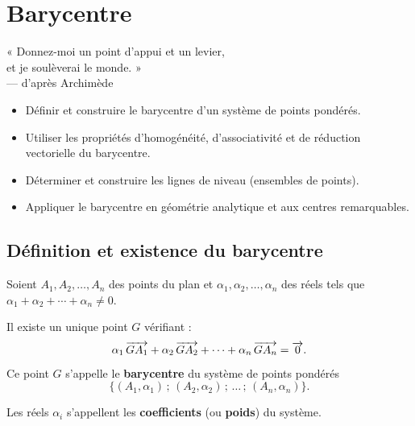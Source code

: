 \chapter{Barycentre}
\begin{citationchapitre}
	« Donnez-moi un point d'appui et un levier,\\
	et je soulèverai le monde. »\\[0.4em]
	— d'après Archimède
\end{citationchapitre}

\begin{objectifs}
	\begin{itemize}[label=\textbullet]
		\item Définir et construire le barycentre d'un système de points pondérés.
		\item Utiliser les propriétés d'homogénéité, d'associativité et de
		réduction vectorielle du barycentre.
		\item Déterminer et construire les lignes de niveau (ensembles de points).
		\item Appliquer le barycentre en géométrie analytique et aux centres
		remarquables.
	\end{itemize}
\end{objectifs}


\section{Définition et existence du barycentre}

\begin{definition}
	Soient $A_1, A_2, \ldots, A_n$ des points du plan et $\alpha_1, \alpha_2, \ldots, \alpha_n$
	des réels tels que $\alpha_1 + \alpha_2 + \cdots + \alpha_n \neq 0$.

	Il existe un unique point $G$ vérifiant :
	$$
	\alpha_1\,\overrightarrow{GA_1} + \alpha_2\,\overrightarrow{GA_2} + \cdots + \alpha_n\,\overrightarrow{GA_n} = \overrightarrow{0}.
	$$
	Ce point $G$ s'appelle le \textbf{barycentre} du système de points pondérés
	$$
	\{(A_1,\alpha_1)\,;\,(A_2,\alpha_2)\,;\,\ldots\,;\,(A_n,\alpha_n)\}.
	$$

	Les réels $\alpha_i$ s'appellent les \textbf{coefficients} (ou \textbf{poids}) du système.
\end{definition}


